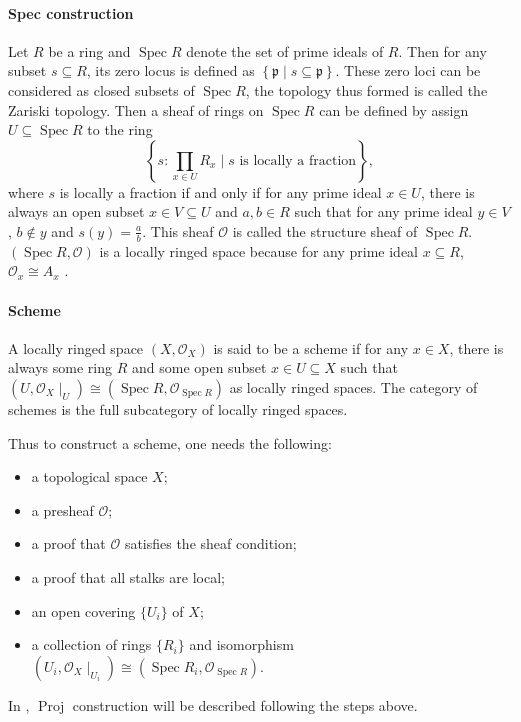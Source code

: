 \documentclass[a4paper,UKenglish,cleveref, autoref, thm-restate]{lipics-v2021}
\begin{document}
\paragraph*{Spec construction} Let $R$ be a ring and $\operatorname{Spec} R$ denote the set of prime ideals of $R$. Then for any subset $s \subseteq R$, its zero locus is defined as $\left\{\mathfrak{p} \mid s \subseteq \mathfrak{p}\right\}$. These zero loci can be considered as closed subsets of $\operatorname{Spec} R$, the topology thus formed is called the Zariski topology. Then a sheaf of rings on $\operatorname{Spec} R$ can be defined by assign $U \subseteq \operatorname{Spec} R$ to the ring
$$
\left\{s : \prod_{x \in U} R_x \mid s \text{~is locally a fraction}\right\},
$$
where $s$ is locally a fraction if and only if for any prime ideal $x \in U$, there is always an open subset $x \in V \subseteq U$ and $a, b \in R$ such that for any prime ideal $y \in V$, $b \not\in y$ and $s(y) = \frac{a}{b}$. This sheaf $\mathcal{O}$ is called the structure sheaf of $\operatorname{Spec}R$. $(\operatorname{Spec} R, \mathcal{O})$ is a locally ringed space because for any prime ideal $x\subseteq R$, $\mathcal{O}_{x}\cong A_x$ \cite{hartshorne1977graduate}.

\paragraph*{Scheme}

\begin{definition}[Scheme]
    A locally ringed space $(X, \mathcal{O}_X)$ is said to be a scheme if for any $x \in X$, there is always some ring $R$ and some open subset $x \in U \subseteq X$ such that $(U, \mathcal{O}_X\!\mid_U) \cong (\operatorname{Spec} R, \mathcal{O}_{\operatorname{Spec} R})$ as locally ringed spaces. The category of schemes is the full subcategory of locally ringed spaces.
\end{definition}

Thus to construct a scheme, one needs the following:
\begin{itemize}
    \item a topological space $X$;
    \item a presheaf $\mathcal{O}$;
    \item a proof that $\mathcal{O}$ satisfies the sheaf condition;
    \item a proof that all stalks are local;
    \item an open covering $\{U_i\}$ of $X$;
    \item a collection of rings $\{R_i\}$ and isomorphism $(U_i, \mathcal{O}_X\!\mid_{U_i})\cong(\operatorname{Spec}R_i, \mathcal{O}_{\operatorname{Spec} R})$.
\end{itemize}
In , $\operatorname{Proj}$ construction will be described following the steps above.
\end{document}
